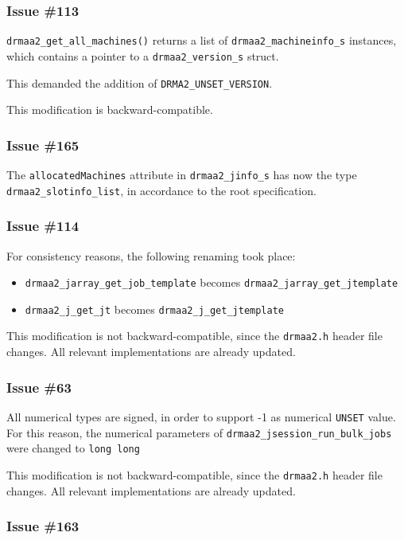 \documentclass{article}
\newcommand{\h}[1]{\texttt{#1}}
\begin{document}
\subsubsection*{Issue \#113}

\h{drmaa2\_get\_all\_machines()} returns a list of \h{drmaa2\_machineinfo\_s} instances, which contains a pointer to a \h{drmaa2\_version\_s} struct.

This demanded the addition of \h{DRMA2\_UNSET\_VERSION}.

This modification is backward-compatible.

\subsubsection*{Issue \#165}

The \h{allocatedMachines} attribute in \h{drmaa2\_jinfo\_s} has now the type \h{drmaa2\_slotinfo\_list}, in accordance to the root specification.

\subsubsection*{Issue \#114}

For consistency reasons, the following renaming took place:

\begin{itemize}
	\item \h{drmaa2\_jarray\_get\_job\_template} becomes \h{drmaa2\_jarray\_get\_jtemplate}
	\item \h{drmaa2\_j\_get\_jt} becomes \h{drmaa2\_j\_get\_jtemplate}
\end{itemize}

This modification is not backward-compatible, since the \h{drmaa2.h} header file changes. All relevant implementations are already updated.

\subsubsection*{Issue \#63}

All numerical types are signed, in order to support -1 as numerical \h{UNSET} value. For this reason, the numerical parameters of \h{drmaa2\_jsession\_run\_bulk\_jobs} were changed to \h{long long}

This modification is not backward-compatible, since the \h{drmaa2.h} header file changes. All relevant implementations are already updated.

\subsubsection*{Issue \#163}
\end{document}
